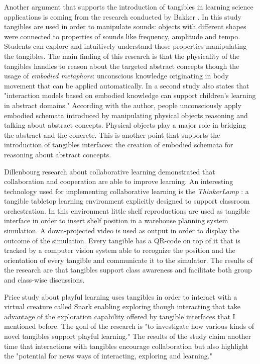 Another argument that supports the introduction of tangibles in learning science applications is coming from the research conducted by Bakker \cite{bakker:moso}. In this study tangibles are used in order to manipulate sounds: objects with different shapes were connected to properties of sounds like frequency, amplitude and tempo. Students can explore and intuitively understand those properties manipulating the tangibles. The main finding of this research is that the physicality of the tangibles handles to reason about the targeted abstract concepts though the usage of \textit {embodied metaphors}: unconscious knowledge originating in body movement that can be applied automatically. In a second study \cite{bakker:embodied} also states that "interaction models based on embodied knowledge can support children’s learning in abstract domains." \cite{bakker:embodied} According with the author, people unconsciously apply embodied schemata introduced by manipulating physical objects reasoning and talking about abstract concepts. Physical objects play a major role in bridging the abstract and the concrete. This is another point that supports the introduction of tangibles interfaces: the creation of embodied schemata for reasoning about abstract concepts. 

Dillenbourg research \cite{dillenbourg:you} about collaborative learning demonstrated that collaboration and cooperation are able to improve learning. An interesting technology used for implementing collaborative learning is the \textit{ThinkerLamp} \cite{do:tinkerlamp}: a tangible tabletop learning environment explicitly designed to support classroom orchestration. In this environment little shelf reproductions are used as tangible interface in order to insert shelf position in a warehouse planning system simulation. A down-projected video is used as output in order to display the outcome of the simulation. Every tangible has a QR-code on top of it that is tracked by a computer vision system able to recognize the position and the orientation of every tangible and communicate it to the simulator. The results of the research are that tangibles support class awareness and facilitate both group and class-wise discussions.

Price study \cite{price:snark} about playful learning uses tangibles in order to interact with a virtual creature called Snark enabling exploring though interacting that take advantage of the exploration capability offered by tangible interfaces that I mentioned before. The goal of the research is "to investigate how various kinds of novel tangibles support playful learning." \cite{price:snark} The results of the study claim another time that interactions with tangibles encourage collaboration but also highlight the "potential for news ways of interacting, exploring and learning." \cite{price:snark}

